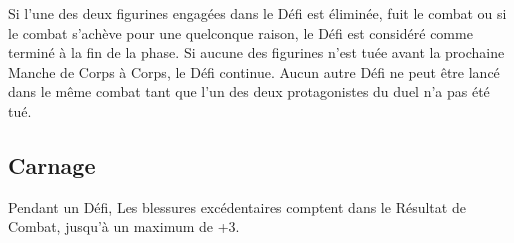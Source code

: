 Si l'une des deux figurines engagées dans le Défi est éliminée, fuit le combat ou si le combat s'achève pour une quelconque raison, le Défi est considéré comme terminé à la fin de la phase. Si aucune des figurines n'est tuée avant la prochaine Manche de Corps à Corps, le Défi continue. Aucun autre Défi ne peut être lancé dans le même combat tant que l'un des deux protagonistes du duel n'a pas été tué.

\subsection{Carnage}

Pendant un Défi, Les blessures excédentaires comptent dans le Résultat de Combat, jusqu'à un maximum de +3.

